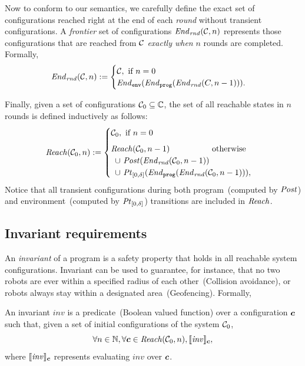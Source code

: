 Now to conform to our semantics, we carefully define the exact set of configurations
reached right at the end of each \emph{round} without transient configurations.
A \emph{frontier} set of configurations $\mathit{End}_\mathit{rnd}(\mathcal{C}, n)$ represents those configurations
that are reached from $\mathcal{C}$ \emph{exactly when} $n$ rounds are completed.
Formally,
\[
\mathit{End}_\mathit{rnd}(\mathcal{C},n) :=
    \begin{cases}
        \mathcal{C}, \text{ if } n = 0\\
        \mathit{End}_{\mathtt{env}}(\mathit{End}_{\mathtt{prog}}(\mathit{End}_\mathit{rnd}(C,n-1))).
    \end{cases}
\]


Finally, given a set of configurations $\mathcal{C}_0\subseteq\mathbb{C}$,
the set of all reachable states in $n$ rounds is defined inductively as follows:
\[
\Reach(\gset_0, n) :=
    \begin{cases}
        \gset_0, \text{ if } n = 0 \\[5pt]
        \Reach(\gset_0,n-1) \text{\hspace{1.8cm}otherwise} \\
        \hspace{0.5em} \cup\ \Post(\frontier(\gset_0,n-1))\\
        \hspace{0.5em} \cup\ \pt{0}{\delta}(\Final(\frontier(\gset_0,n-1))),\\
    \end{cases}
\]
Notice that all transient configurations during both program~(computed by $\mathit{Post}$) and environment~(computed by $\mathit{Pt}_{[0,\delta]}$) transitions are included in $\mathit{Reach}$.


\subsection{Invariant requirements}
\label{sec:inv-po}

\newcommand{\Inv}{\mathit{inv}\xspace}

An \emph{invariant} of a \lgname program is a safety property that holds in all reachable system configurations.
Invariant can be used to guarantee, for instance, that no two robots are ever within a specified radius of each other~(Collision avoidance),
or robots always stay within a designated area~(Geofencing).
Formally,
\begin{definition}
An invariant $\Inv$ is a predicate~(Boolean valued function) over a configuration $\mathit{\boldsymbol{c}}$ such that,
given a set of initial configurations of the system $\mathcal{C}_0$,
\[
\forall n\in\naturals, \forall\gconfig \in \Reach(\gset_0, n), \eec{\Inv}{\gconfig},
\]
where $\eec{\Inv}{\gconfig}$ represents evaluating $\Inv$ over $\mathit{\boldsymbol{c}}$.
\end{definition}

